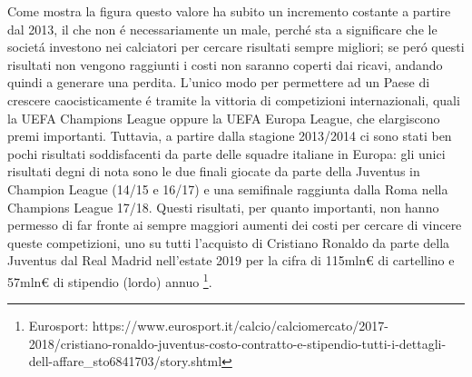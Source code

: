 \documentclass[
    corpo=11.5pt,
    oneside,
    evenboxes,
    tipotesi=triennale,
    stile=classica,
    oldstyle,
    autoretitolo,
    greek,
]{toptesi}
\begin{document}
\begin{interlinea}{1.5}
Come mostra la figura questo valore ha subito un incremento costante a partire dal 2013, il che non \'e necessariamente un male, perch\'e 
sta a significare che le societ\'a investono nei calciatori per cercare risultati sempre migliori; se per\'o questi risultati non vengono
raggiunti i costi non saranno coperti dai ricavi, andando quindi a generare una perdita. L'unico modo per permettere ad un Paese di crescere
caocisticamente \'e tramite la vittoria di competizioni internazionali, quali la UEFA Champions League oppure la UEFA Europa League, che
elargiscono premi importanti. Tuttavia, a partire dalla stagione 2013/2014 ci sono stati ben pochi risultati soddisfacenti 
da parte delle squadre italiane in Europa: gli unici risultati degni di nota sono le due finali giocate da parte della Juventus in 
Champion League (14/15 e 16/17) e una semifinale raggiunta dalla Roma nella Champions League 17/18. Questi risultati, per quanto importanti,
non hanno permesso di far fronte ai sempre maggiori aumenti dei costi per cercare di vincere queste competizioni, uno su tutti l'acquisto
di Cristiano Ronaldo da parte della Juventus dal Real Madrid nell'estate 2019 per la cifra di 115mln€ di cartellino e 57mln€ di stipendio (lordo) annuo
\footnote{Eurosport: https://www.eurosport.it/calcio/calciomercato/2017-2018/cristiano-ronaldo-juventus-costo-contratto-e-stipendio-tutti-i-dettagli-dell-affare\_sto6841703/story.shtml}.\\

\end{interlinea}
\end{document}
